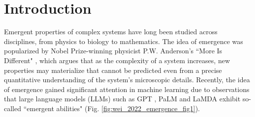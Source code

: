 \section{Introduction}



Emergent properties of complex systems have long been studied across disciplines, from physics to biology to mathematics.
The idea of emergence was popularized by Nobel Prize-winning physicist P.W. Anderson's ``More Is Different" \citep{anderson1972more}, which argues that as the complexity of a system increases, new properties may materialize that cannot be predicted even from a precise quantitative understanding of the system's microscopic details. Recently, the idea of emergence gained significant attention in machine learning due to observations that large language models (LLMs) such as GPT \citep{brown2020language}, PaLM \citep{chowdhery2022palm}  and LaMDA \cite{thoppilan2022lamda} exhibit so-called ``emergent abilities" \citep{wei2022emergent, ganguli2022predictability,srivastava2022beyond,brown2020language} (Fig. \ref{fig:wei_2022_emergence_fig1}).


